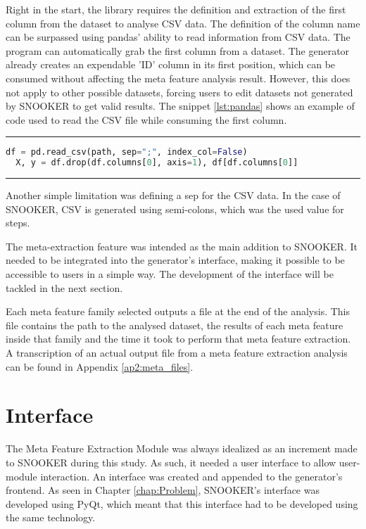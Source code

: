Right in the start, the library requires the definition and extraction of the first column from the dataset to analyse CSV data. The definition of the column name can be surpassed using pandas' ability to read information from CSV data. The program can automatically grab the first column from a dataset. The generator already creates an expendable 'ID' column in its first position, which can be consumed without affecting the meta feature analysis result. However, this does not apply to other possible datasets, forcing users to edit datasets not generated by SNOOKER to get valid results. The snippet \ref{lst:pandas} shows an example of code used to read the CSV file while consuming the first column.

\par\noindent\rule{\textwidth}{0.4pt}
\begin{lstlisting}[language=Python, caption=Importing the csv dataset with ID column, label={lst:pandas}]
  df = pd.read_csv(path, sep=";", index_col=False)
  X, y = df.drop(df.columns[0], axis=1), df[df.columns[0]]
\end{lstlisting}
\par\noindent\rule{\textwidth}{0.4pt}

Another simple limitation was defining a sep for the CSV data. In the case of SNOOKER, CSV is generated using semi-colons, which was the used value for steps.

The meta-extraction feature was intended as the main addition to SNOOKER. It needed to be integrated into the generator's interface, making it possible to be accessible to users in a simple way. The development of the interface will be tackled in the next section.

Each meta feature family selected outputs a file at the end of the analysis. This file contains the path to the analysed dataset, the results of each meta feature inside that family and the time it took to perform that meta feature extraction. A transcription of an actual output file from a meta feature extraction analysis can be found in Appendix \ref{ap2:meta_files}.

\section{Interface}
The Meta Feature Extraction Module was always idealized as an increment made to SNOOKER during this study. As such, it needed a user interface to allow user-module interaction. An interface was created and appended to the generator's frontend. As seen in Chapter \ref{chap:Problem}, SNOOKER's interface was developed using PyQt, which meant that this interface had to be developed using the same technology.

